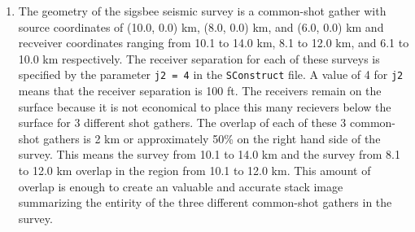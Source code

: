 \begin{enumerate}
  \item The geometry of the sigsbee seismic survey is a common-shot gather with source coordinates of (10.0, 0.0) km, (8.0, 0.0) km, and (6.0, 0.0) km and recveiver coordinates ranging from 10.1 to 14.0 km, 8.1 to 12.0 km, and 6.1 to 10.0 km respectively. The receiver separation for each of these surveys is specified by the parameter \texttt{j2 = 4} in the \texttt{SConstruct} file. A value of 4 for \texttt{j2} means that the receiver separation is 100 ft. The receivers remain on the surface because it is not economical to place this many recievers below the surface for 3 different shot gathers. The overlap of each of these 3 common-shot gathers is 2 km or approximately 50\% on the right hand side of the survey. This means the survey from  10.1 to 14.0 km and the survey from 8.1 to 12.0 km overlap in the region from 10.1 to 12.0 km. This amount of overlap is enough to create an valuable and accurate stack image summarizing the entirity of the three different common-shot gathers in the survey.


\end{enumerate}
